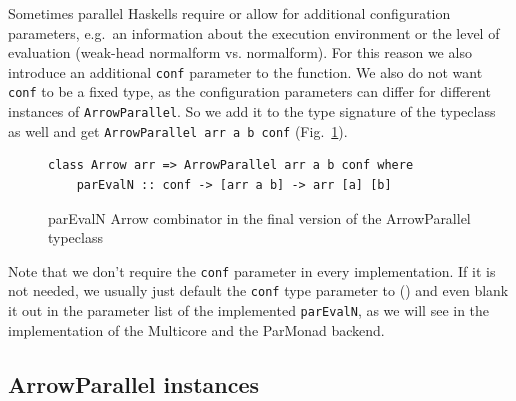 \documentclass{jfp1}
\newcommand{\inlinecode}[1]{\texttt{#1}}
\DeclareRobustCommand{\hairspn}{\hspace{1pt}\nolinebreak}%
\DeclareRobustCommand{\eg}{{e.\hairspn{}g.~}}
\begin{document}
Sometimes parallel Haskells require or allow for additional configuration parameters, \eg an information about the execution environment or the level of evaluation (weak-head normalform vs. normalform). For this reason we also introduce an additional \inlinecode{conf} parameter to the function. We also do not want \inlinecode{conf} to be a fixed type, as the configuration parameters can differ for different instances of \inlinecode{ArrowParallel}. So we add it to the type signature of the typeclass as well and get \inlinecode{ArrowParallel arr a b conf} (Fig.~\ref{fig:parEvalNArrowTypeClassFinal}).
\begin{figure}[h]
\begin{lstlisting}[frame=htrbl]
class Arrow arr => ArrowParallel arr a b conf where
	parEvalN :: conf -> [arr a b] -> arr [a] [b]
\end{lstlisting}
\caption{parEvalN Arrow combinator in the final version of the ArrowParallel typeclass}
\label{fig:parEvalNArrowTypeClassFinal}
\end{figure}
Note that we don't require the \inlinecode{conf} parameter in every implementation. If it is not needed, we usually just default the \inlinecode{conf} type parameter to () and even blank it out in the parameter list of the implemented \inlinecode{parEvalN}, as we will see in the implementation of the Multicore and the ParMonad backend.

\subsection{ArrowParallel instances}
\end{document}
